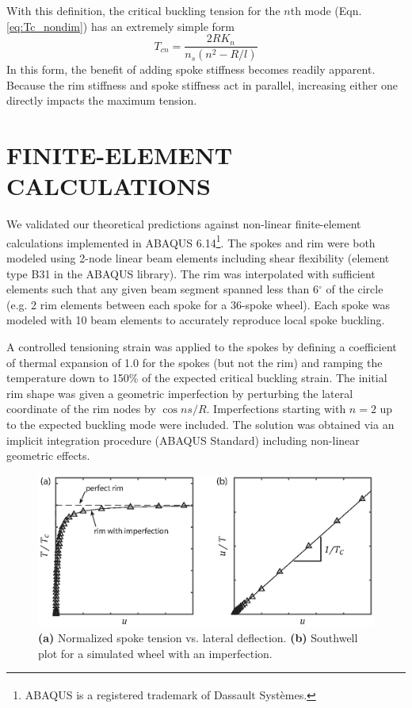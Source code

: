 \documentclass{bmd2016p}
\begin{document}
With this definition, the critical buckling tension for the $n$th mode (Eqn. \ref{eq:Tc_nondim}) has an extremely simple form
	\begin{equation}\label{eq:Tc_Kn}
	T_{cn} = \frac{2RK_n}{n_s(n^2 - R/l)}
	\end{equation}
In this form, the benefit of adding spoke stiffness becomes readily apparent. Because the rim stiffness and spoke stiffness act in parallel, increasing either one directly impacts the maximum tension.



\section{FINITE-ELEMENT CALCULATIONS}
We validated our theoretical predictions against non-linear finite-element calculations implemented in ABAQUS\textsuperscript{\textregistered} 6.14\footnote{ABAQUS\textsuperscript{\textregistered} is a registered trademark of Dassault Syst\`emes.}. The spokes and rim were both modeled using 2-node linear beam elements including shear flexibility (element type B31 in the ABAQUS library). The rim was interpolated with sufficient elements such that any given beam segment spanned less than 6$^{\circ}$ of the circle (e.g. 2 rim elements between each spoke for a 36-spoke wheel). Each spoke was modeled with 10 beam elements to accurately reproduce local spoke buckling.

A controlled tensioning strain was applied to the spokes by defining a coefficient of thermal expansion of 1.0 for the spokes (but not the rim) and ramping the temperature down to 150\% of the expected critical buckling strain. The initial rim shape was given a geometric imperfection by perturbing the lateral coordinate of the rim nodes by $\cos{ns/R}$. Imperfections starting with $n=2$ up to the expected buckling mode were included. The solution was obtained via an implicit integration procedure (ABAQUS Standard) including non-linear geometric effects.

\begin{figure}[!ht]
\centering
\includegraphics[scale=1.0]{figures/bmd_figures-07.eps}
\caption{\textbf{(a)} Normalized spoke tension vs. lateral deflection. \textbf{(b)} Southwell plot for a simulated wheel with an imperfection.}
\label{fig:Southwell}
\end{figure}
\end{document}
